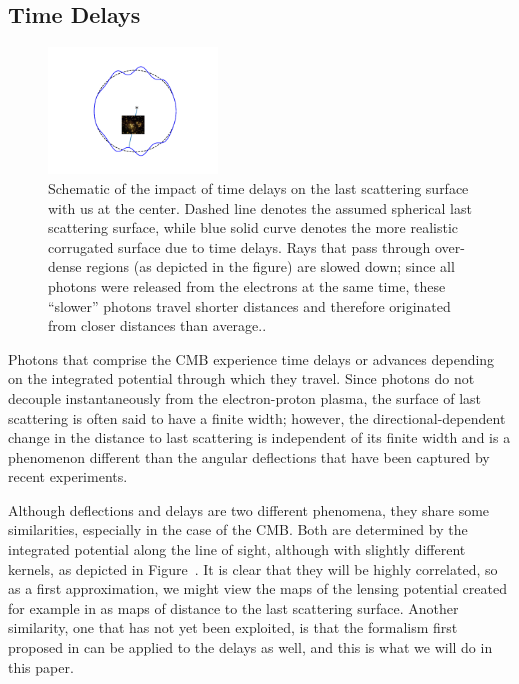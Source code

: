 \subsection{Time Delays}

\begin{figure}
\centering
\includegraphics[width=0.4\textwidth]{td.pdf}
\caption{\footnotesize \label{fig:td}Schematic of the impact of time delays on the last scattering surface with us at the center. Dashed line denotes the assumed spherical last scattering surface, while blue solid curve denotes the more realistic corrugated surface due to time delays. Rays that pass through over-dense regions (as depicted in the figure) are slowed down; since all photons were released from the electrons at the same time, these ``slower'' photons travel shorter distances and therefore originated from closer distances than average..}
\end{figure}

Photons that comprise the CMB experience time delays or advances depending on the integrated potential through which they travel. Since photons do not decouple instantaneously from the electron-proton plasma, the surface of last scattering is often said to have a finite width; however, the directional-dependent change in the distance to last scattering is independent of its finite width and is a phenomenon different than the angular deflections that have been captured by recent experiments.

Although deflections and delays are two different phenomena, they share some similarities, especially in the case of the CMB. Both are determined by the integrated potential along the line of sight, although with slightly different kernels, as depicted in Figure~. It is clear that they will be highly correlated, so as a first approximation, we might view the maps of the lensing potential created for example in \citet{Aghanim:2018oex} as maps of distance to the last scattering surface. Another similarity, one that has not yet been exploited, is that the formalism first proposed in \citet{Hu:2001tn} can be applied to the delays as well, and this is what we will do in this paper. 